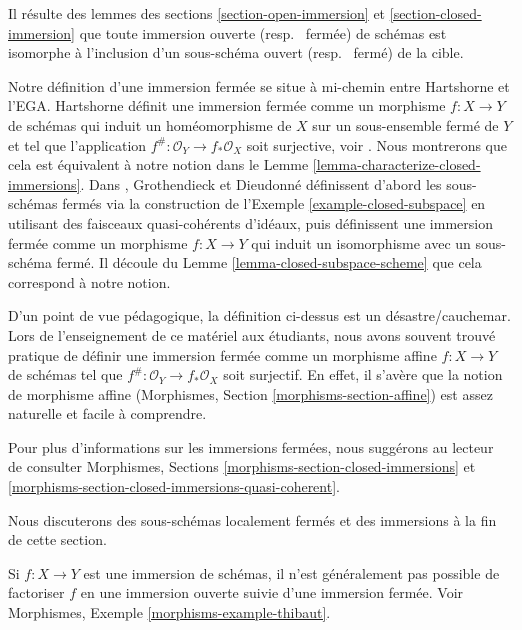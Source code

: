 \noindent
Il résulte des lemmes des sections  \ref{section-open-immersion}  et  \ref{section-closed-immersion}  que toute
immersion ouverte (resp. \  fermée) de schémas est isomorphe à
l'inclusion d'un sous-schéma ouvert (resp. \  fermé) de la cible.

\medskip\noindent
Notre définition d'une immersion fermée se situe à mi-chemin entre Hartshorne et
l'EGA. Hartshorne définit une immersion fermée comme un morphisme $f : X \to Y$ de
schémas qui induit un homéomorphisme de $X$  sur un sous-ensemble fermé de
 $Y$ et tel que l'application $f^\# : \mathcal{O}_Y \to f_*\mathcal{O}_X$ soit surjective, voir \cite[Page 85]{H}. Nous montrerons
que cela est équivalent à notre notion dans le Lemme \ref{lemma-characterize-closed-immersions}. Dans
 \cite{EGA}, Grothendieck et Dieudonn\'e définissent d'abord les
sous-schémas fermés via la construction de l'Exemple \ref{example-closed-subspace} en utilisant des
faisceaux quasi-cohérents d'idéaux, puis définissent une immersion fermée comme un
morphisme $f : X \to Y$ qui induit un isomorphisme avec un sous-schéma fermé. Il
découle du Lemme  \ref{lemma-closed-subspace-scheme}  que cela correspond à notre notion.

\medskip\noindent
D'un point de vue pédagogique, la définition ci-dessus est un désastre/cauchemar.
Lors de l'enseignement de ce matériel aux étudiants, nous avons souvent trouvé
pratique de définir une immersion fermée comme un morphisme affine  $f : X \to Y$  de
schémas tel que  $f^\# : \mathcal{O}_Y \to f_*\mathcal{O}_X$  soit surjectif. En effet, il s’avère que la notion de
morphisme affine (Morphismes, Section  \ref{morphisms-section-affine}) est assez naturelle et facile
à comprendre.

\medskip\noindent
Pour plus d'informations sur les immersions fermées, nous suggérons au lecteur de
consulter Morphismes, Sections  \ref{morphisms-section-closed-immersions}  et  \ref{morphisms-section-closed-immersions-quasi-coherent}.

\medskip\noindent
Nous discuterons des sous-schémas localement fermés et des immersions à la fin de
cette section.

\begin{remark}
\label{remark-not-reverse-open-closed}
Si  $f : X \to Y$  est une immersion de schémas, il n'est généralement pas possible
de factoriser  $f$  en une immersion ouverte suivie d'une immersion fermée.
Voir Morphismes, Exemple  \ref{morphisms-example-thibaut}.
\end{remark}

